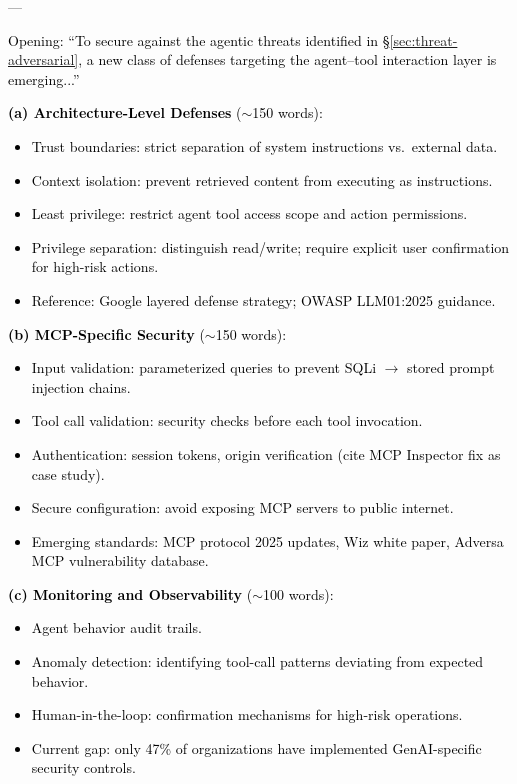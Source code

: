 ––\documentclass[preprint,12pt]{elsarticle}
\newcommand{\outline}[1]{\textcolor{black}{#1}}
\begin{document}
\outline{%
Opening: ``To secure against the agentic threats identified in \S\ref{sec:threat-adversarial}, a new class of defenses targeting the agent--tool interaction layer is emerging...''

\medskip\noindent\textbf{(a) Architecture-Level Defenses} ($\sim$150 words):
\begin{itemize}[nosep,leftmargin=1.5em]
    \item Trust boundaries: strict separation of system instructions vs.\ external data.
    \item Context isolation: prevent retrieved content from executing as instructions.
    \item Least privilege: restrict agent tool access scope and action permissions.
    \item Privilege separation: distinguish read/write; require explicit user confirmation for high-risk actions.
    \item Reference: Google layered defense strategy; OWASP LLM01:2025 guidance.
\end{itemize}

\medskip\noindent\textbf{(b) MCP-Specific Security} ($\sim$150 words):
\begin{itemize}[nosep,leftmargin=1.5em]
    \item Input validation: parameterized queries to prevent SQLi $\to$ stored prompt injection chains.
    \item Tool call validation: security checks before each tool invocation.
    \item Authentication: session tokens, origin verification (cite MCP Inspector fix as case study).
    \item Secure configuration: avoid exposing MCP servers to public internet.
    \item Emerging standards: MCP protocol 2025 updates, Wiz white paper, Adversa MCP vulnerability database.
\end{itemize}

\medskip\noindent\textbf{(c) Monitoring and Observability} ($\sim$100 words):
\begin{itemize}[nosep,leftmargin=1.5em]
    \item Agent behavior audit trails.
    \item Anomaly detection: identifying tool-call patterns deviating from expected behavior.
    \item Human-in-the-loop: confirmation mechanisms for high-risk operations.
    \item Current gap: only 47\% of organizations have implemented GenAI-specific security controls.
\end{itemize}

}
\end{document}
